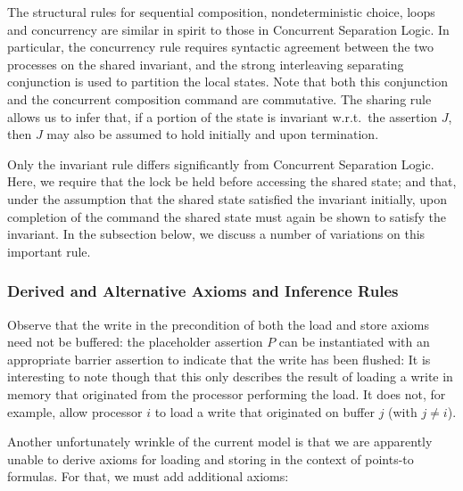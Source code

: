 \documentclass[11pt]{report}
\begin{document}
The structural rules for sequential composition, nondeterministic choice, loops and concurrency are similar in spirit to those in Concurrent Separation Logic. In particular, the concurrency rule requires syntactic agreement between the two processes on the shared invariant, and the strong interleaving separating conjunction is used to partition the local states. Note that both this conjunction and the concurrent composition command are commutative. The sharing rule allows us to infer that, if a portion of the state is invariant w.r.t.\ the assertion $J$, then $J$ may also be assumed to hold initially and upon termination. 

Only the invariant rule differs significantly from Concurrent Separation Logic. Here, we require that the lock be held before accessing the shared state; and that, under the assumption that the shared state satisfied the invariant initially, upon completion of the command the shared state must again be shown to satisfy the invariant. In the subsection below, we discuss a number of variations on this important rule. 

\subsubsection{Derived and Alternative Axioms and Inference Rules}

Observe that the write in the precondition of both the load and store axioms need not be buffered: the placeholder assertion $P$ can be instantiated with an appropriate barrier assertion to indicate that the write has been flushed: 
 It is interesting to note though that this only describes the result of loading a write in memory that originated from the processor performing the load. It does not, for example, allow processor $i$ to load a write that originated on buffer $j$ (with $j \neq i$).

Another unfortunately wrinkle of the current model is that we are apparently unable to derive axioms for loading and storing in the context of points-to formulas. For that, we must add additional axioms: 
\end{document}
